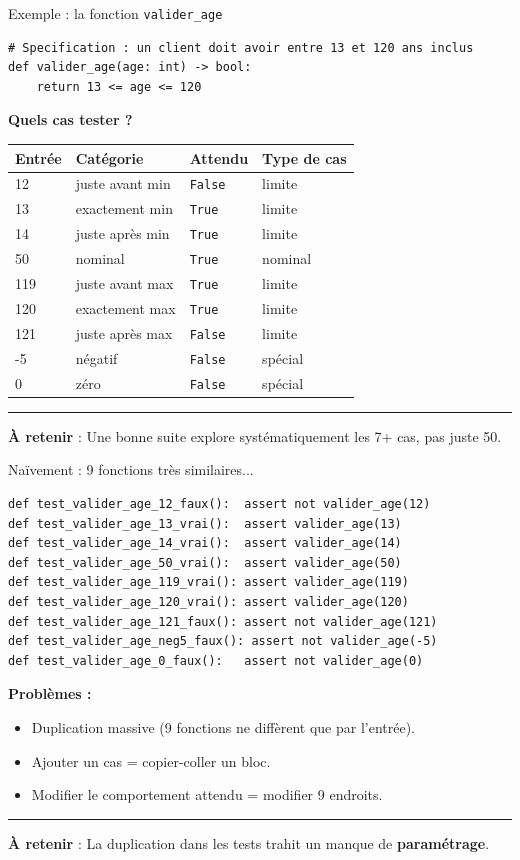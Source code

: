 \documentclass[aspectratio=169,11pt]{beamer}
\newcommand{\takeaway}[1]{%
\vfill\begin{beamercolorbox}[wd=\linewidth,sep=0.4em]{}
\color{accent2}\rule[0.6ex]{1.2em}{1.2pt}\hspace{0.4em}%
\textbf{\color{accent2}\small À retenir} \textcolor{textsoft}{:} %
{\small\color{textmain}#1}
\end{beamercolorbox}}
\begin{document}
\begin{frame}[fragile,t,shrink=10]{Exemple : la fonction \texttt{valider\_age}}
\begin{lstlisting}[style=pythondark]
# Specification : un client doit avoir entre 13 et 120 ans inclus
def valider_age(age: int) -> bool:
    return 13 <= age <= 120
\end{lstlisting}
\vspace{0.3cm}
\textbf{Quels cas tester ?}\\[0.3em]
\footnotesize
\begin{tabular}{@{}l l l l@{}}
\toprule
\textbf{Entrée} & \textbf{Catégorie} & \textbf{Attendu} & \textbf{Type de cas} \\
\midrule
12 & juste avant min & \texttt{False} & limite \\
13 & exactement min & \texttt{True}  & limite \\
14 & juste après min & \texttt{True}  & limite \\
50 & nominal & \texttt{True} & nominal \\
119 & juste avant max & \texttt{True} & limite \\
120 & exactement max & \texttt{True} & limite \\
121 & juste après max & \texttt{False} & limite \\
-5 & négatif & \texttt{False} & spécial \\
0  & zéro & \texttt{False} & spécial \\
\bottomrule
\end{tabular}
\takeaway{Une bonne suite explore systématiquement les 7+ cas, pas juste 50.}
\end{frame}

\begin{frame}[fragile,t]{Naïvement : 9 fonctions très similaires...}
\begin{lstlisting}[style=pythondark]
def test_valider_age_12_faux():  assert not valider_age(12)
def test_valider_age_13_vrai():  assert valider_age(13)
def test_valider_age_14_vrai():  assert valider_age(14)
def test_valider_age_50_vrai():  assert valider_age(50)
def test_valider_age_119_vrai(): assert valider_age(119)
def test_valider_age_120_vrai(): assert valider_age(120)
def test_valider_age_121_faux(): assert not valider_age(121)
def test_valider_age_neg5_faux(): assert not valider_age(-5)
def test_valider_age_0_faux():   assert not valider_age(0)
\end{lstlisting}
\vspace{0.2cm}
\textbf{Problèmes :}
\begin{itemize}\footnotesize
\item Duplication massive (9 fonctions ne diffèrent que par l'entrée).
\item Ajouter un cas = copier-coller un bloc.
\item Modifier le comportement attendu = modifier 9 endroits.
\end{itemize}
\takeaway{La duplication dans les tests trahit un manque de \textbf{paramétrage}.}
\end{frame}
\end{document}
